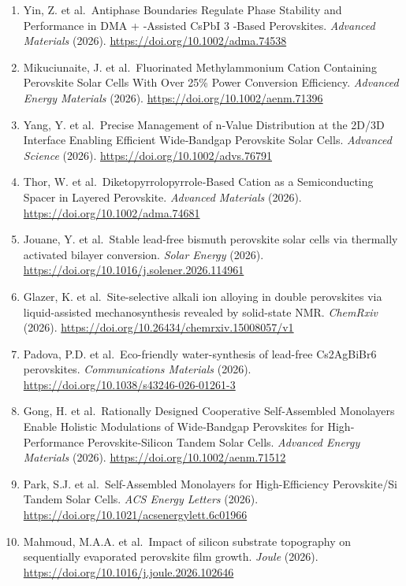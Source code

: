 \documentclass[
  11pt,
]{article}
\begin{document}
\begin{enumerate}
  (2026). \url{https://doi.org/10.1021/acsaem.6c02063}
\item
  Yin, Z. et al.~Antiphase Boundaries Regulate Phase Stability and
  Performance in DMA + ‐Assisted CsPbI 3 ‐Based Perovskites.
  \emph{Advanced Materials} (2026).
  \url{https://doi.org/10.1002/adma.74538}
\item
  Mikuciunaite, J. et al.~Fluorinated Methylammonium Cation Containing
  Perovskite Solar Cells With Over 25\% Power Conversion Efficiency.
  \emph{Advanced Energy Materials} (2026).
  \url{https://doi.org/10.1002/aenm.71396}
\item
  Yang, Y. et al.~Precise Management of n‐Value Distribution at the
  2D/3D Interface Enabling Efficient Wide‐Bandgap Perovskite Solar
  Cells. \emph{Advanced Science} (2026).
  \url{https://doi.org/10.1002/advs.76791}
\item
  Thor, W. et al.~Diketopyrrolopyrrole‐Based Cation as a Semiconducting
  Spacer in Layered Perovskite. \emph{Advanced Materials} (2026).
  \url{https://doi.org/10.1002/adma.74681}
\item
  Jouane, Y. et al.~Stable lead-free bismuth perovskite solar cells via
  thermally activated bilayer conversion. \emph{Solar Energy} (2026).
  \url{https://doi.org/10.1016/j.solener.2026.114961}
\item
  Glazer, K. et al.~Site-selective alkali ion alloying in double
  perovskites via liquid-assisted mechanosynthesis revealed by
  solid-state NMR. \emph{ChemRxiv} (2026).
  \url{https://doi.org/10.26434/chemrxiv.15008057/v1}
\item
  Padova, P.D. et al.~Eco-friendly water-synthesis of lead-free
  Cs2AgBiBr6 perovskites. \emph{Communications Materials} (2026).
  \url{https://doi.org/10.1038/s43246-026-01261-3}
\item
  Gong, H. et al.~Rationally Designed Cooperative Self‐Assembled
  Monolayers Enable Holistic Modulations of Wide‐Bandgap Perovskites for
  High‐Performance Perovskite‐Silicon Tandem Solar Cells. \emph{Advanced
  Energy Materials} (2026). \url{https://doi.org/10.1002/aenm.71512}
\item
  Park, S.J. et al.~Self-Assembled Monolayers for High-Efficiency
  Perovskite/Si Tandem Solar Cells. \emph{ACS Energy Letters} (2026).
  \url{https://doi.org/10.1021/acsenergylett.6c01966}
\item
  Mahmoud, M.A.A. et al.~Impact of silicon substrate topography on
  sequentially evaporated perovskite film growth. \emph{Joule} (2026).
  \url{https://doi.org/10.1016/j.joule.2026.102646}

\end{enumerate}
\end{document}
